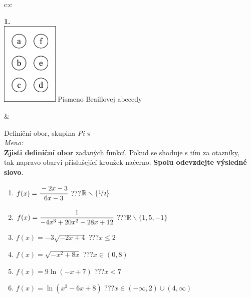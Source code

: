 \documentclass[10pt]{report}
\begin{document}
\begin{tabular}{c:c}
\begin{minipage}[c][99mm][t]{0.49\linewidth}
\begin{center}
\begin{minipage}{0.20\linewidth}
\begin{center}
{\Huge\bfseries 1.} \\[2mm]
\includegraphics[height=40mm]{../images/braille.png}
{\small Písmeno Braillovej abecedy}
\end{center}
\end{minipage}
\end{center}
\end{minipage}
&
\begin{minipage}[c][99mm][t]{0.49\linewidth}
\begin{center}
\vspace{7mm}
{\huge Definiční obor, skupina \textit{Pi $\pi$} -}\\[4.5mm]
\textit{Meno:}\phantom{xxxxxxxxxxxxxxxxxxxxxxxxxxxxxxxxxxxxxxxxxxxxxxxxxxxxxxxxxxxxxxxxx}\\[3.5mm]
\textbf{Zjisti definiční obor} zadaných funkcí. Pokud se shoduje s tím za otazníky,\\tak napravo obarvi příslušející kroužek načerno. \textbf{Spolu odevzdejte výsledné slovo}.\\[3mm]
\begin{minipage}{0.77\linewidth}
\begin{center}
\begin{varwidth}{\textwidth}
\begin{enumerate}
\normalsize
\item $f(x)=\cfrac{-2x-3}{6x-3}$\quad \dotfill\; ???\;\dotfill \quad $\mathbb{R}\smallsetminus\{\nicefrac{1}{2}\}$
\item $f(x)=\cfrac{1}{-4x^3+20x^2-28x+12}$\quad \dotfill\; ???\;\dotfill \quad $\mathbb{R}\smallsetminus\{1,5,-1\}$
\item $f(x)=-3\sqrt{-2x+4}$\quad \dotfill\; ???\;\dotfill \quad $x\leq2$
\item $f(x)=\sqrt{-x^2+8x}$\quad \dotfill\; ???\;\dotfill \quad $x\in(0 , 8)$
\item $f(x)=9\ln{(-x+7)}$\quad \dotfill\; ???\;\dotfill \quad $x<7$
\item $f(x)=\ln{(x^2-6x+8)}$\quad \dotfill\; ???\;\dotfill \quad $x\in(-\infty , 2)\cup(4 , \infty)$

\end{enumerate}
\end{varwidth}
\end{center}
\end{minipage}
\end{center}
\end{minipage}
\end{tabular}
\end{document}
